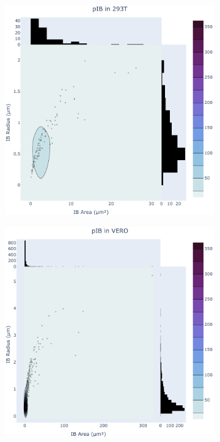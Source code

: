 \begin{figure}
    \begin{subfigure}{0.495\textwidth}
        \caption{}
        \includegraphics[width=\textwidth]{09. Chapter 4/Figs/01. pIB/01. pIB characterisation/01. heatmap_pib-293t.pdf} 
    \end{subfigure}
    \hfill
    \begin{subfigure}{0.495\textwidth}
        \caption{}
        \includegraphics[width=\textwidth]{09. Chapter 4/Figs/01. pIB/01. pIB characterisation/02. heatmap_pib-vero.pdf}

\end{subfigure}
\end{figure}
